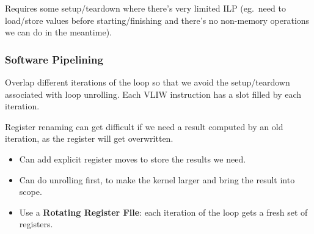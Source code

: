\documentclass[11pt]{article}
\begin{document}
{{{            Requires some setup/teardown where there's very limited ILP (eg.\ need to load/store values before starting/finishing and there's no non-memory operations we can do in the meantime).
        }
        \subsubsection*{Software Pipelining}
        {
            Overlap different iterations of the loop so that we avoid the setup/teardown associated with loop unrolling. Each VLIW instruction has a slot filled by each iteration.

            Register renaming can get difficult if we need a result computed by an old iteration, as the register will get overwritten.

            \begin{itemize}
            \item Can add explicit register moves to store the results we need.
            \item Can do unrolling first, to make the kernel larger and bring the result into scope.
            \item Use a \textbf{Rotating Register File}: each iteration of the loop gets a fresh set of registers.
            \end{itemize}
        }
    }
}
\end{document}
